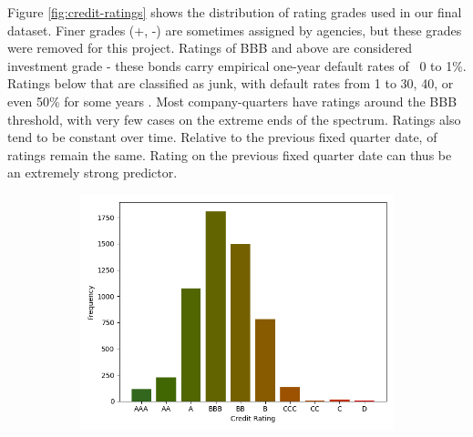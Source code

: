 \documentclass{article}[11pt]
\begin{document}
    Figure \ref{fig:credit-ratings} shows the distribution of rating grades used in our final dataset. Finer grades (+, -) are sometimes assigned by agencies, but these grades were removed for this project. Ratings of BBB and above are considered investment grade - these bonds carry empirical one-year default rates of ~0 to 1\%. Ratings below that are classified as junk, with default rates from 1 to 30, 40, or even 50\% for some years \citep{s_and_p_global_ratings_s_2024}. Most company-quarters have ratings around the BBB threshold, with very few cases on the extreme ends of the spectrum. Ratings also tend to be constant over time. Relative to the previous fixed quarter date, \shareNotChanges \space of ratings remain the same. Rating on the previous fixed quarter date can thus be an extremely strong predictor.

    \begin{figure}
        \caption{Credit Ratings}
        \begin{subfigure}[h]{0.4925\textwidth}
            \centering
            \includegraphics[width=0.95\hsize]{../Output/All Data EDA/Tabular EDA/Distribution of Rating Issuances_no_title.png}
        \end{subfigure}
        \begin{subfigure}[h]{0.4925\textwidth}
            \centering

\end{subfigure}
\end{figure}
\end{document}
